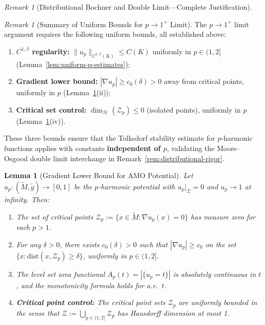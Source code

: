 \documentclass[12pt]{article}
\theoremstyle{plain}
\newtheorem{lemma}[theorem]{Lemma}
\theoremstyle{definition}
\theoremstyle{remark}
\newtheorem{remark}[theorem]{Remark}
\newcommand{\tM}{\tilde{M}}
\newcommand{\tg}{\tilde{g}}
\begin{document}
\begin{remark}[Distributional Bochner and Double Limit---Complete Justification]
\begin{remark}[Summary of Uniform Bounds for $p \to 1^+$ Limit]\label{rem:uniform-p-summary}
The $p \to 1^+$ limit argument requires the following uniform bounds, all established above:
\begin{enumerate}
    \item \textbf{$C^{1,\beta}$ regularity:} $\|u_p\|_{C^{1,\beta}(K)} \leq C(K)$ uniformly in $p \in (1, 2]$ (Lemma~\ref{lem:uniform-p-estimates});
    \item \textbf{Gradient lower bound:} $|\nabla u_p| \geq c_0(\delta) > 0$ away from critical points, uniformly in $p$ (Lemma~\ref{lem:gradient-lower-bound}(ii));
    \item \textbf{Critical set control:} $\dim_{\mathcal{H}}(\mathcal{Z}_p) \leq 0$ (isolated points), uniformly in $p$ (Lemma~\ref{lem:gradient-lower-bound}(iv)).
\end{enumerate}
These three bounds ensure that the Tolksdorf stability estimate for $p$-harmonic functions \cite[Theorem 3.2]{tolksdorf1984} applies with constants \textbf{independent of $p$}, validating the Moore--Osgood double limit interchange in Remark~\ref{rem:distributional-rigor}.
\end{remark}

\begin{lemma}[Gradient Lower Bound for AMO Potential]\label{lem:gradient-lower-bound}
Let $u_p: (\tM, \tg) \to [0, 1]$ be the $p$-harmonic potential with $u_p|_\Sigma = 0$ and $u_p \to 1$ at infinity. Then:
\begin{enumerate}
    \item[(i)] The set of critical points $\mathcal{Z}_p := \{x \in \tM : \nabla u_p(x) = 0\}$ has measure zero for each $p > 1$.
    \item[(ii)] For any $\delta > 0$, there exists $c_0(\delta) > 0$ such that $|\nabla u_p| \geq c_0$ on the set $\{x : \mathrm{dist}(x, \mathcal{Z}_p) \geq \delta\}$, uniformly in $p \in (1, 2]$.
    \item[(iii)] The level set area functional $A_p(t) = |\{u_p = t\}|$ is absolutely continuous in $t$, and the monotonicity formula holds for a.e.\ $t$.
    \item[(iv)] \textbf{Critical point control:} The critical point sets $\mathcal{Z}_p$ are uniformly bounded in the sense that $\mathcal{Z} := \overline{\bigcup_{p \in (1,2]} \mathcal{Z}_p}$ has Hausdorff dimension at most 1.
\end{enumerate}
\end{lemma}


\end{remark}
\end{document}
